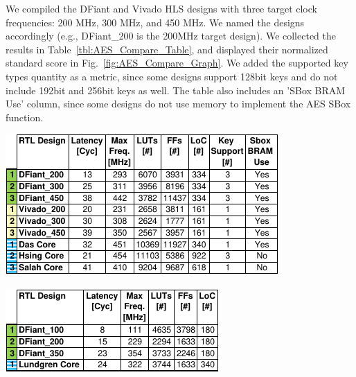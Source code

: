 We compiled the DFiant and Vivado HLS designs with three target clock frequencies: 200 MHz, 300 MHz, and 450 MHz. We named the designs accordingly (e.g., DFiant\_200 is the 200MHz target design). We collected the results in Table~\ref{tbl:AES_Compare_Table}, and displayed their normalized standard score in Fig.~\ref{fig:AES_Compare_Graph}. We added the supported key types quantity as a metric, since some designs support 128bit keys and do not include 192bit and 256bit keys as well. The table also includes an 'SBox BRAM Use' column, since some designs do not use memory to implement the AES SBox function.

\begin{table}[t!]
  \centering
  \begin{minipage}[t][5cm][t]{0.62\linewidth}
    \centering
    \label{tbl:AES_Compare_Table}
    \includegraphics[scale=1]{graphics/AES_Compare_Table.pdf} 
  \end{minipage}
  \hfill
  \begin{minipage}[t][5cm][t]{0.37\linewidth}
    \centering
    \label{tbl:FP_Compare_Table}
    \includegraphics[scale=1]{graphics/FP_Compare_Table.pdf} 
  \end{minipage}
  \begin{minipage}[b][3.8cm][b]{0.62\linewidth}
  	\centering

\end{minipage}
\end{table}
